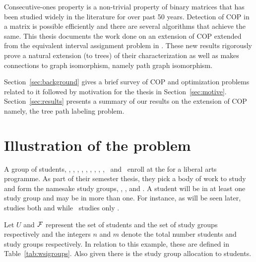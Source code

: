 \documentclass[MS]             %
              {iitmdiss_as}    %
\begin{document}
Consecutive-ones property is a non-trivial property of binary matrices
that has been studied widely in the literature for over past 50
years. Detection of COP in a matrix is possible efficiently and there
are several algorithms that achieve the same. This thesis documents
the work done on an extension of COP extended from the equivalent
interval assignment problem in \cite{nsnrs09}. These new results
rigorously prove a natural extension (to trees) of their
characterization as well as makes connections to graph isomorphism,
namely path graph isomorphism.

Section~\ref{sec:background} gives a brief survey of COP and
optimization problems related to it followed by motivation for the
thesis in Section~\ref{sec:motive}.  Section~\ref{sec:results}
presents a summary of our results on the extension of COP namely, the
tree path labeling problem. 



\section{Illustration of the problem}
\label{sec:problem}

A group of students, \Pa, \Pig, \Sn, \Wo, \Vi, \Li, \Ch, \Sa, \Fr,
\Sc\ and \Lu\ enroll at the {\WSI} for a liberal arts programme.  As
part of their semester thesis, they pick a body of work to study and
form the namesake study groups, {\LLL}, {\GGG}, {\BBB} and
{\TTT}. A student will be
in at least one study group and may be in more than one. For instance,
as will be seen later, {\Fr} studies both {\LLL} and {\TTT} while \Wo\
studies only \BBB.

Let $U$ and ${\cal F}$ represent the set of students and the set of study
groups respectively and the integers $n$ and $m$ denote the total
number students and study groups respectively. In relation to this
example, these are defined in Table~\ref{tab:wsigroups}. Also given
there is the study group allocation to students.
 
\end{document}

